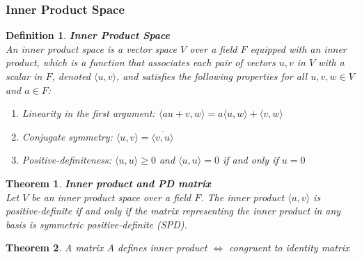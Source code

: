 \documentclass[11pt]{book} %
\newtheorem{theorem}{Theorem}[section]
\newtheorem{definition}{Definition}[section]
\begin{document}
\subsubsection{Inner Product Space}

\begin{definition}{\textbf{Inner Product Space}} \\
    An inner product space is a vector space \( V \) over a field \( F \) equipped with an inner product, which is a function that associates each pair of vectors \( u, v \) in \( V \) with a scalar in \( F \), denoted \( \langle u, v \rangle \), and satisfies the following properties for all \( u, v, w \in V \) and \( a \in F \):
    \begin{enumerate}
        \item Linearity in the first argument: \( \langle au + v, w \rangle = a \langle u, w \rangle + \langle v, w \rangle \)
        \item Conjugate symmetry: \( \langle u, v \rangle = \overline{\langle v, u \rangle} \)
        \item Positive-definiteness: \( \langle u, u \rangle \geq 0 \) and \( \langle u, u \rangle = 0 \) if and only if \( u = 0 \)
    \end{enumerate}
\end{definition}


\begin{theorem}{\textbf{Inner product and PD matrix}} \\
    Let \( V \) be an inner product space over a field \( F \). The inner product \( \langle u, v \rangle \) is positive-definite if and only if 
    the matrix representing the inner product in any basis is symmetric positive-definite (SPD).
\end{theorem}

\begin{theorem}{A matrix \( A \) defines inner product $\iff$ congruent to identity matrix} \\
\end{theorem}
\end{document}
